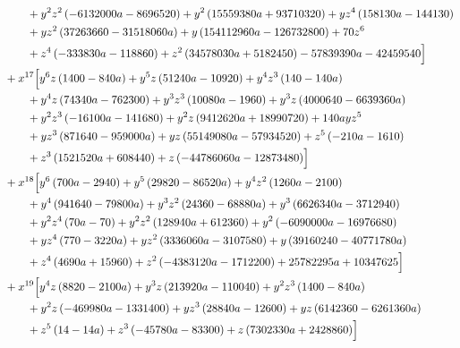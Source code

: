 \begin{align*}
&\qquad + y^{2} z^{2} \left(- 6132000 a - 8696520\right) + y^{2} \left(15559380 a + 93710320\right) + y z^{4} \left(158130 a - 144130\right)\\
&\qquad + y z^{2} \left(37263660 - 31518060 a\right) + y \left(154112960 a - 126732800\right) + 70 z^{6}\\
&\qquad + z^{4} \left(- 333830 a - 118860\right) + z^{2} \left(34578030 a + 5182450\right) - 57839390 a - 42459540\Bigr]\\
&{}+x^{17}\Bigl[y^{6} z \left(1400 - 840 a\right) + y^{5} z \left(51240 a - 10920\right) + y^{4} z^{3} \left(140 - 140 a\right)\\
&\qquad + y^{4} z \left(74340 a - 762300\right) + y^{3} z^{3} \left(10080 a - 1960\right) + y^{3} z \left(4000640 - 6639360 a\right)\\
&\qquad + y^{2} z^{3} \left(- 16100 a - 141680\right) + y^{2} z \left(9412620 a + 18990720\right) + 140 a y z^{5}\\
&\qquad + y z^{3} \left(871640 - 959000 a\right) + y z \left(55149080 a - 57934520\right) + z^{5} \left(- 210 a - 1610\right)\\
&\qquad + z^{3} \left(1521520 a + 608440\right) + z \left(- 44786060 a - 12873480\right)\Bigr]\\
&{}+x^{18}\Bigl[y^{6} \left(700 a - 2940\right) + y^{5} \left(29820 - 86520 a\right) + y^{4} z^{2} \left(1260 a - 2100\right)\\
&\qquad + y^{4} \left(941640 - 79800 a\right) + y^{3} z^{2} \left(24360 - 68880 a\right) + y^{3} \left(6626340 a - 3712940\right)\\
&\qquad + y^{2} z^{4} \left(70 a - 70\right) + y^{2} z^{2} \left(128940 a + 612360\right) + y^{2} \left(- 6090000 a - 16976680\right)\\
&\qquad + y z^{4} \left(770 - 3220 a\right) + y z^{2} \left(3336060 a - 3107580\right) + y \left(39160240 - 40771780 a\right)\\
&\qquad + z^{4} \left(4690 a + 15960\right) + z^{2} \left(- 4383120 a - 1712200\right) + 25782295 a + 10347625\Bigr]\\
&{}+x^{19}\Bigl[y^{4} z \left(8820 - 2100 a\right) + y^{3} z \left(213920 a - 110040\right) + y^{2} z^{3} \left(1400 - 840 a\right)\\
&\qquad + y^{2} z \left(- 469980 a - 1331400\right) + y z^{3} \left(28840 a - 12600\right) + y z \left(6142360 - 6261360 a\right)\\
&\qquad + z^{5} \left(14 - 14 a\right) + z^{3} \left(- 45780 a - 83300\right) + z \left(7302330 a + 2428860\right)\Bigr]\\

\end{align*}
